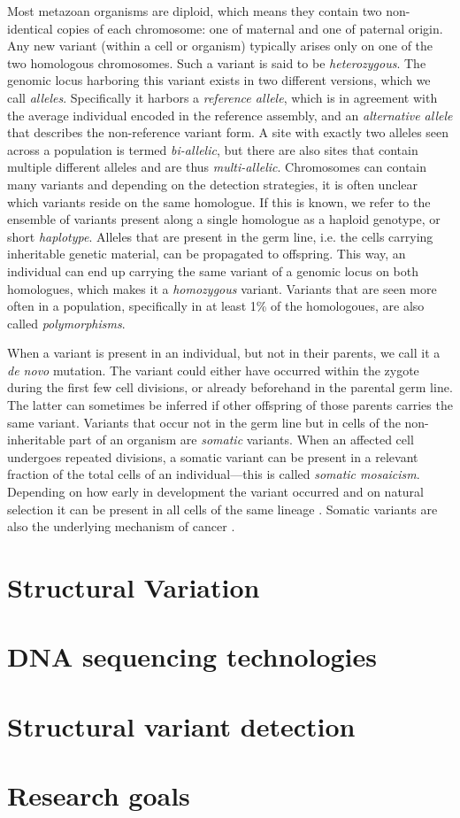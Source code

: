 Most metazoan organisms are diploid, which means they contain two non-identical
copies of each chromosome: one of maternal and one of paternal origin. Any new
variant (within a cell or organism) typically arises only on one of the two
homologous chromosomes. Such a variant is said to be \emph{heterozygous}. The
genomic locus harboring this variant exists in two different versions, which we
call \emph{alleles}. Specifically it harbors a \emph{reference allele}, which is
in agreement with the average individual encoded in the reference assembly, and
an \emph{alternative allele} that describes the non-reference variant form. A
site with exactly two alleles seen across a population is termed
\emph{bi-allelic}, but there are also sites that contain multiple different
alleles and are thus \emph{multi-allelic}. Chromosomes can contain many variants
and depending on the detection strategies, it is often unclear which variants
reside on the same homologue. If this is known, we refer to the ensemble of
variants present along a single homologue as a haploid genotype, or short
\emph{haplotype}. Alleles that are present in the germ line, i.e. the cells
carrying inheritable genetic material, can be propagated to offspring. This way,
an individual can end up carrying the same variant of a genomic locus on both
homologues, which makes it a \emph{homozygous} variant. Variants that are seen
more often in a population, specifically in at least 1\% of the homologoues,
are also called \emph{polymorphisms}.

When a variant is present in an individual, but not in their parents, we call it
a \emph{de novo} mutation. The variant could either have occurred within the
zygote during the first few cell divisions, or already beforehand in the
parental germ line. The latter can sometimes be inferred if other offspring of
those parents carries the same variant. Variants that occur not in the germ line
but in cells of the non-inheritable part of an organism are \emph{somatic}
variants. When an affected cell undergoes repeated divisions, a somatic variant
can be present in a relevant fraction of the total cells of an individual---this
is called \emph{somatic mosaicism}. Depending on how early in development the
variant occurred and on natural selection it can be present in all cells of the
same lineage \citep{Youssoufian2002}. Somatic variants are also the underlying
mechanism of cancer \citep{Campbell2007}.


\section{Structural Variation}
\label{sec:sv}



\section{DNA sequencing technologies}
\label{sec:sequencing}



\section{Structural variant detection}
\label{sec:sv_detection}



\section{Research goals}
\label{sec:motivation}



